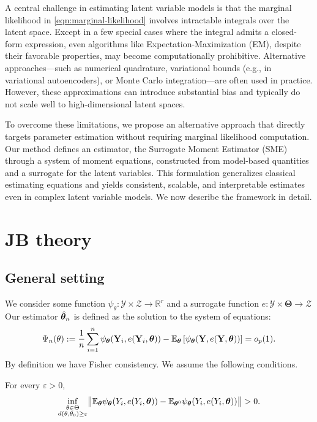 \documentclass[twoside,11pt]{article}
\begin{document}
A central challenge in estimating latent variable models is that the marginal likelihood in \eqref{eqn:marginal-likelihood} involves intractable integrals over the latent space. Except in a few special cases where the integral admits a closed-form expression, even algorithms like Expectation-Maximization (EM), despite their favorable properties, may become computationally prohibitive. Alternative approaches—such as numerical quadrature, variational bounds (e.g., in variational autoencoders), or Monte Carlo integration—are often used in practice. However, these approximations can introduce substantial bias and typically do not scale well to high-dimensional latent spaces.

To overcome these limitations, we propose an alternative approach that directly targets parameter estimation without requiring marginal likelihood computation. Our method defines an estimator, the Surrogate Moment Estimator (SME) through a system of moment equations, constructed from model-based quantities and a surrogate for the latent variables. This formulation generalizes classical estimating equations and yields consistent, scalable, and interpretable estimates even in complex latent variable models. We now describe the framework in detail.


\section{JB theory}

\newcommand{\R}{\mathbb{R}}

\subsection{General setting}

We consider some function $\psi_\theta:\mathcal{Y}\times \mathcal{Z} \to \mathbb{R}^r$ and a surrogate function $e : \mathcal{Y} \times \bm{\Theta} \to \mathcal{Z}$
Our estimator $\hat{{\bm{\theta}}}_n$ is defined as the solution to the system of equations:
\begin{equation}
\Psi_n(\theta) := \frac{1}{n} \sum_{i=1}^n \psi_{\bm{\theta}}({\bf Y}_i, e({\bf Y}_i, {\bm{\theta}})) 
-
\mathbb{E}_{\bm{\theta}}
\left[ 
\psi_{\bm{\theta}}({\bf Y}, e({\bf Y}, {\bm{\theta}})) 
\right] = o_p(1).
\end{equation}
By definition we have Fisher consistency.
We assume the following conditions.

\begin{assumptionA}\label{ass. uniqueness}
For every $\varepsilon>0$,
$$
\inf_{\substack{\theta\in\Theta\\d(\theta,\theta_0)\ge\varepsilon}}
\bigl\| \mathbb{E}_{\bm{\theta}} \psi_{\bm{\theta}}(Y_i, e(Y_i,{\bm{\theta}}) ) - \mathbb{E}_{{\bm{\theta}}^0} \psi_{\bm{\theta}}(Y_i, e(Y_i,{\bm{\theta}}) ) \bigr\|
>0.
$$
\end{assumptionA}
\end{document}
